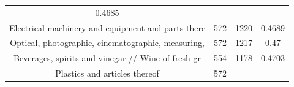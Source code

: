 \documentclass[10pt,]{article}
\begin{document}
\begin{longtable}[]{@{}cccc@{}}
\begin{minipage}[t]{0.09\columnwidth}
0.4685\strut
\end{minipage}\tabularnewline
\begin{minipage}[t]{0.38\columnwidth}\centering\strut
Electrical machinery and equipment and parts there\strut
\end{minipage} & \begin{minipage}[t]{0.21\columnwidth}\centering\strut
572\strut
\end{minipage} & \begin{minipage}[t]{0.20\columnwidth}\centering\strut
1220\strut
\end{minipage} & \begin{minipage}[t]{0.09\columnwidth}\centering\strut
0.4689\strut
\end{minipage}\tabularnewline
\begin{minipage}[t]{0.38\columnwidth}\centering\strut
Optical, photographic, cinematographic, measuring,\strut
\end{minipage} & \begin{minipage}[t]{0.21\columnwidth}\centering\strut
572\strut
\end{minipage} & \begin{minipage}[t]{0.20\columnwidth}\centering\strut
1217\strut
\end{minipage} & \begin{minipage}[t]{0.09\columnwidth}\centering\strut
0.47\strut
\end{minipage}\tabularnewline
\begin{minipage}[t]{0.38\columnwidth}\centering\strut
Beverages, spirits and vinegar // Wine of fresh gr\strut
\end{minipage} & \begin{minipage}[t]{0.21\columnwidth}\centering\strut
554\strut
\end{minipage} & \begin{minipage}[t]{0.20\columnwidth}\centering\strut
1178\strut
\end{minipage} & \begin{minipage}[t]{0.09\columnwidth}\centering\strut
0.4703\strut
\end{minipage}\tabularnewline
\begin{minipage}[t]{0.38\columnwidth}\centering\strut
Plastics and articles thereof\strut
\end{minipage} & \begin{minipage}[t]{0.21\columnwidth}\centering\strut
572\strut
\end{minipage} & \begin{minipage}[t]{0.20\columnwidth}\centering\strut

\end{minipage}
\end{longtable}
\end{document}
